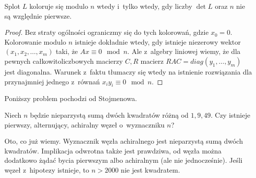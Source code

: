 

\begin{proposition}
    \label{prp:colour_det}
    Splot $L$ koloruje się modulo $n$ wtedy i~tylko wtedy, gdy liczby $\det L$ oraz $n$ nie są względnie pierwsze.
\end{proposition}

\begin{proof}
    Bez straty ogólności ograniczmy się do tych kolorowań, gdzie $x_0 = 0$.
    Kolorowanie modulo $n$ istnieje dokładnie wtedy, gdy istnieje niezerowy wektor $(x_1, x_2, \ldots, x_m)$ taki, że $Ax \equiv 0 \mod n$.
    Ale z~algebry liniowej wiemy, że dla pewnych całkowitoliczbowych macierzy $C, R$ macierz $RAC = diag(y_1, \ldots, y_m)$ jest diagonalna.
    Warunek z~faktu tłumaczy się wtedy na istnienie rozwiązania dla przynajmniej jednego z~równań $x_iy_i \equiv 0 \mod n$.
\end{proof}

Poniższy problem pochodzi od Stojmenowa.

\begin{conjecture}
    Niech $n$ będzie nieparzystą sumą dwóch kwadratów różną od $1, 9, 49$.
    Czy istnieje pierwszy, alternujący, achiralny węzeł o~wyznaczniku $n$?
\end{conjecture}

Oto, co już wiemy.
Wyznacznik węzła achiralnego jest nieparzystą sumą dwóch kwadratów.
Implikacja odwrotna także jest prawdziwa, od węzła można dodatkowo żądać bycia pierwszym albo achiralnym (ale nie jednocześnie).
Jeśli węzeł z~hipotezy istnieje, to $n > 2000$ nie jest kwadratem.

